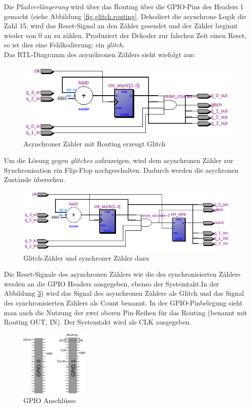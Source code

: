 Die Pfad\textit{verlängerung} wird über das Routing über die GPIO-Pins des Headers 1 gemacht (siehe Abbildung \ref{fig.glitch.routing}. Dekodiert die asynchrone Logik die Zahl 15, wird das  Reset-Signal an den Zähler gesendet und der Zähler beginnt wieder von 0 an zu zählen. Produziert der Dekoder zur falschen Zeit einen Reset, so ist dies eine Fehlkodierung: ein \textit{glitch}.\\

Das RTL-Diagramm des asynchronen Zählers sieht wiefolgt aus:
\begin{figure}[H]
	\centering
	\includegraphics[width=1\textwidth]{images/glitch/glitch_RTL_nurGlitch.png}
	\caption{Asynchroner Zähler mit Routing erzeugt Glitch}
	\label{fig.glitch.RTL_nurGlitch}
\end{figure}

Um die Lösung gegen \textit{glitches} aufzuzeigen, wird dem asynchronen Zähler zur Synchronisation ein Flip-Flop nachgeschalten. Dadurch werden die asychronen Zustände übersehen. 
\begin{figure}[H]
	\centering
	\includegraphics[width=\textwidth]{images/glitch/glitch_RTL.png}
	\caption{Glitch-Zähler und synchroner Zähler dazu}
	\label{fig.glitch.RTL_mit_synchr.Zaehler}
\end{figure}

Die Reset-Signale des asynchronen Zählers wie die des synchronisierten Zählers werden an die GPIO Headers ausgegeben, ebenso der Systemtakt.In der Abbildung \ref{fig.glitch.GPIO}) wird das Signal des asynchronen Zählers als Glitch und das Signal des synchronisierten Zählers als Count benannt. In der GPIO-Pinbelegung sieht man auch die Nutzung der zwei oberen Pin-Reihen für das Routing (benannt mit Routing OUT, IN). Der Systemtakt wird als CLK ausgegeben.
\begin{figure}[H]
	\centering
	\includegraphics[width=0.3\textwidth]{images/glitch/GPIO_Belegung.png}
	\caption{GPIO Anschlüsse}
	\label{fig.glitch.GPIO}
\end{figure}


